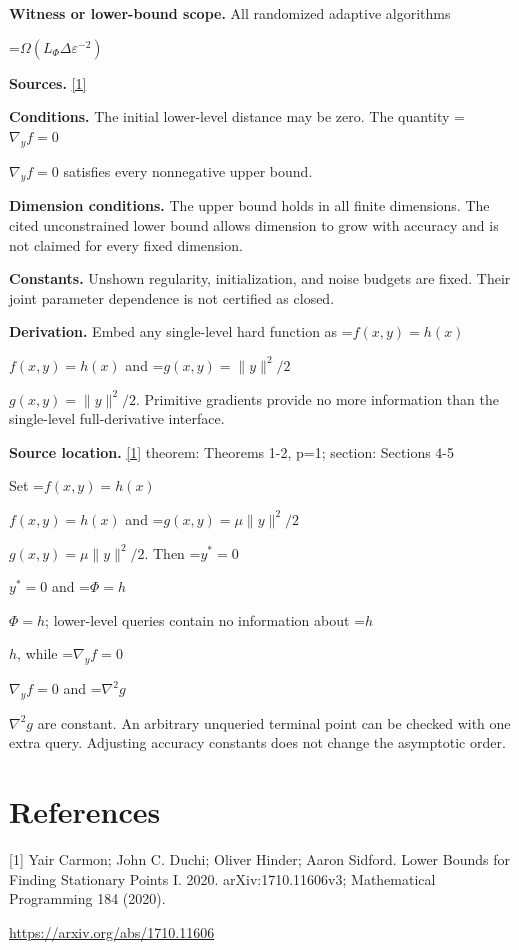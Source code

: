 \documentclass[10pt,a4paper]{article}
\newcommand{\AtlasMath}[1]{\par\begingroup\centering\setbox0=\hbox{$\displaystyle #1$}\ifdim\wd0>1.4\linewidth\typeout{ATLAS WIDE FORMULA: \the\wd0}\fi\ifdim\wd0>\linewidth\resizebox{\linewidth}{!}{\box0}\else\box0\fi\par\endgroup}
\newcommand{\AtlasInlineMath}[1]{\begingroup\setbox0=\hbox{$#1$}\ifdim\wd0>.4\linewidth\endgroup\AtlasMath{#1}\else\endgroup$#1$\fi}
\begin{document}
\textbf{Witness or lower-bound scope.} All randomized adaptive algorithms

\AtlasMath{\Omega(L_\Phi\Delta\varepsilon^{-2})}
\textbf{Sources.} \href{https://arxiv.org/abs/1710.11606}{[1]}

\textbf{Conditions.} The initial lower-level distance may be zero. The quantity \AtlasInlineMath{\nabla_yf=0} satisfies every nonnegative upper bound.

\textbf{Dimension conditions.} The upper bound holds in all finite dimensions. The cited unconstrained lower bound allows dimension to grow with accuracy and is not claimed for every fixed dimension.

\textbf{Constants.} Unshown regularity, initialization, and noise budgets are fixed. Their joint parameter dependence is not certified as closed.

\textbf{Derivation.} Embed any single-level hard function as \AtlasInlineMath{f(x,y)=h(x)} and \AtlasInlineMath{g(x,y)=\|y\|^2/2}. Primitive gradients provide no more information than the single-level full-derivative interface.

\textbf{Source location.} \href{https://arxiv.org/abs/1710.11606}{[1]} theorem: Theorems 1-2, p=1; section: Sections 4-5

Set \AtlasInlineMath{f(x,y)=h(x)} and \AtlasInlineMath{g(x,y)=\mu\|y\|^2/2}. Then \AtlasInlineMath{y^*=0} and \AtlasInlineMath{\Phi=h}; lower-level queries contain no information about \AtlasInlineMath{h}, while \AtlasInlineMath{\nabla_yf=0} and \AtlasInlineMath{\nabla^2g} are constant. An arbitrary unqueried terminal point can be checked with one extra query. Adjusting accuracy constants does not change the asymptotic order.

\section{References}
[1] Yair Carmon; John C. Duchi; Oliver Hinder; Aaron Sidford. Lower Bounds for Finding Stationary Points I. 2020. arXiv:1710.11606v3; Mathematical Programming 184 (2020).

\url{https://arxiv.org/abs/1710.11606}
\end{document}

